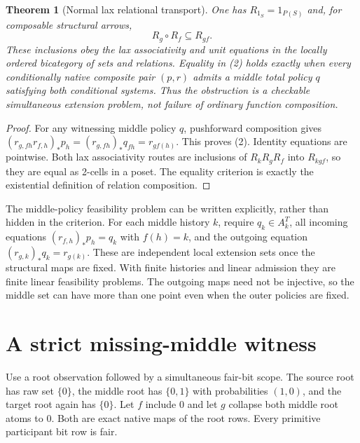 \documentclass[11pt]{article}
\newtheorem{theorem}{Theorem}\newtheorem{proposition}[theorem]{Proposition}
\begin{document}
\begin{theorem}[Normal lax relational transport]
One has $R_{1_S}=1_{P(S)}$ and, for composable structural arrows,
\[
                        R_g\circ R_f\subseteq R_{gf}. \tag{2}
\]
These inclusions obey the lax associativity and unit equations in the locally ordered bicategory of sets and relations. Equality in (2) holds exactly when every conditionally native composite pair $(p,r)$ admits a middle total policy $q$ satisfying both conditional systems. Thus the obstruction is a checkable simultaneous extension problem, not failure of ordinary function composition.
\end{theorem}
\begin{proof}
For any witnessing middle policy $q$, pushforward composition gives
$(r_{g,fh}r_{f,h})_*p_h=(r_{g,fh})_*q_{fh}=r_{gf(h)}$.
This proves (2). Identity equations are pointwise. Both lax associativity routes are inclusions of $R_kR_gR_f$ into $R_{kgf}$, so they are equal as 2-cells in a poset. The equality criterion is exactly the existential definition of relation composition.\end{proof}

The middle-policy feasibility problem can be written explicitly, rather than hidden in the criterion. For each middle history $k$, require $q_k\in A^T_k$, all incoming equations $(r_{f,h})_*p_h=q_k$ with $f(h)=k$, and the outgoing equation $(r_{g,k})_*q_k=r_{g(k)}$. These are independent local extension sets once the structural maps are fixed. With finite histories and linear admission they are finite linear feasibility problems. The outgoing maps need not be injective, so the middle set can have more than one point even when the outer policies are fixed.

\section{A strict missing-middle witness}
Use a root observation followed by a simultaneous fair-bit scope. The source root has raw set $\{0\}$, the middle root has $\{0,1\}$ with probabilities $(1,0)$, and the target root again has $\{0\}$. Let $f$ include $0$ and let $g$ collapse both middle root atoms to $0$. Both are exact native maps of the root rows. Every primitive participant bit row is fair.
\end{document}
